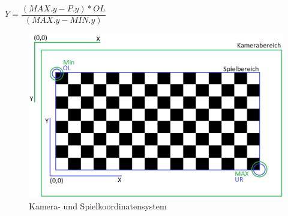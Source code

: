 $Y = \dfrac{(MAX.y - P.y) * OL}{(MAX.y - MIN.y)}$
\begin{figure}[h]
	\label{fig:chessboard}
	\centering
	\includegraphics[scale=0.3]{bilder/schachbrettkamera.png}
	\caption{Kamera- und Spielkoordinatensystem}
\end{figure}\\
